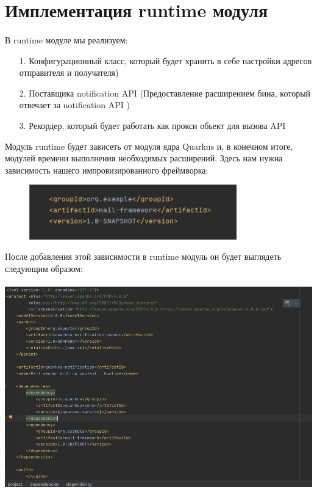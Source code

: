 \documentclass[russian,11pt]{article}
\begin{document}
\section{Имплементация runtime модуля}
\paragraph{ }
В runtime модуле мы реализуем:
 \begin{enumerate}
		\item[  1.] Конфигурационный класс, который будет хранить в себе настройки адресов отправителя и получателя)
		\item[  2.] Поставщика notification API (Предоставление расширением бина, который отвечает за notification API )
		\item[  3.] Рекордер, который будет работать как прокси обьект для вызова API
	\end{enumerate} 
	
	Модуль runtime будет зависеть от модуля ядра Quarkus и, в конечном итоге, модулей времени выполнения необходимых расширений. Здесь нам нужна зависимость нашего импровизированного фреймворка:

\begin{figure}[H]
	\centering
	\includegraphics[scale=1.5, width=9cm]{4}
\end{figure}


После добавления этой зависимости в runtime модуль он будет выглядеть следующим образом:

\paragraph{\includegraphics[scale=1.5, width=\textwidth]{5}}
\end{document}
